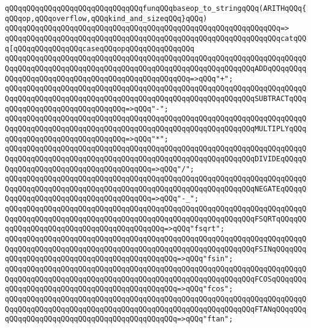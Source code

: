 \newline
\newline
\verb|qQQqqQQqqQQqqQQqqQQqqQQqqQQqqQQqfunqQQqbaseop_to_stringqQQq(ARITHqQQq{qQQqop,qQQqoverflow,qQQqkind_and_sizeqQQq}qQQq)|\newline
\verb|qQQqqQQqqQQqqQQqqQQqqQQqqQQqqQQqqQQqqQQqqQQqqQQqqQQqqQQqqQQqqQQq=>|\newline
\verb|qQQqqQQqqQQqqQQqqQQqqQQqqQQqqQQqqQQqqQQqqQQqqQQqqQQqqQQqqQQqqQQqcatqQQq[qQQqqQQqqQQqqQQqcaseqQQqopqQQqqQQqqQQqqQQq|\newline
\verb|qQQqqQQqqQQqqQQqqQQqqQQqqQQqqQQqqQQqqQQqqQQqqQQqqQQqqQQqqQQqqQQqqQQqqQQqqQQqqQQqqQQqqQQqqQQqqQQqqQQqqQQqqQQqqQQqqQQqqQQqqQQqqQQqADDqQQqqQQqqQQqqQQqqQQqqQQqqQQqqQQqqQQqqQQqqQQqqQQqqQQq=>qQQq"+";|\newline
\verb|qQQqqQQqqQQqqQQqqQQqqQQqqQQqqQQqqQQqqQQqqQQqqQQqqQQqqQQqqQQqqQQqqQQqqQQqqQQqqQQqqQQqqQQqqQQqqQQqqQQqqQQqqQQqqQQqqQQqqQQqqQQqqQQqSUBTRACTqQQqqQQqqQQqqQQqqQQqqQQqqQQqqQQq=>qQQq"-";|\newline
\verb|qQQqqQQqqQQqqQQqqQQqqQQqqQQqqQQqqQQqqQQqqQQqqQQqqQQqqQQqqQQqqQQqqQQqqQQqqQQqqQQqqQQqqQQqqQQqqQQqqQQqqQQqqQQqqQQqqQQqqQQqqQQqqQQqMULTIPLYqQQqqQQqqQQqqQQqqQQqqQQqqQQqqQQq=>qQQq"*";|\newline
\verb|qQQqqQQqqQQqqQQqqQQqqQQqqQQqqQQqqQQqqQQqqQQqqQQqqQQqqQQqqQQqqQQqqQQqqQQqqQQqqQQqqQQqqQQqqQQqqQQqqQQqqQQqqQQqqQQqqQQqqQQqqQQqqQQqDIVIDEqQQqqQQqqQQqqQQqqQQqqQQqqQQqqQQqqQQqqQQq=>qQQq"/";|\newline
\verb|qQQqqQQqqQQqqQQqqQQqqQQqqQQqqQQqqQQqqQQqqQQqqQQqqQQqqQQqqQQqqQQqqQQqqQQqqQQqqQQqqQQqqQQqqQQqqQQqqQQqqQQqqQQqqQQqqQQqqQQqqQQqqQQqNEGATEqQQqqQQqqQQqqQQqqQQqqQQqqQQqqQQqqQQqqQQq=>qQQq"-_";|\newline
\verb|qQQqqQQqqQQqqQQqqQQqqQQqqQQqqQQqqQQqqQQqqQQqqQQqqQQqqQQqqQQqqQQqqQQqqQQqqQQqqQQqqQQqqQQqqQQqqQQqqQQqqQQqqQQqqQQqqQQqqQQqqQQqqQQqFSQRTqQQqqQQqqQQqqQQqqQQqqQQqqQQqqQQqqQQqqQQqqQQq=>qQQq"fsqrt";|\newline
\verb|qQQqqQQqqQQqqQQqqQQqqQQqqQQqqQQqqQQqqQQqqQQqqQQqqQQqqQQqqQQqqQQqqQQqqQQqqQQqqQQqqQQqqQQqqQQqqQQqqQQqqQQqqQQqqQQqqQQqqQQqqQQqqQQqFSINqQQqqQQqqQQqqQQqqQQqqQQqqQQqqQQqqQQqqQQqqQQqqQQq=>qQQq"fsin";|\newline
\verb|qQQqqQQqqQQqqQQqqQQqqQQqqQQqqQQqqQQqqQQqqQQqqQQqqQQqqQQqqQQqqQQqqQQqqQQqqQQqqQQqqQQqqQQqqQQqqQQqqQQqqQQqqQQqqQQqqQQqqQQqqQQqqQQqFCOSqQQqqQQqqQQqqQQqqQQqqQQqqQQqqQQqqQQqqQQqqQQqqQQq=>qQQq"fcos";|\newline
\verb|qQQqqQQqqQQqqQQqqQQqqQQqqQQqqQQqqQQqqQQqqQQqqQQqqQQqqQQqqQQqqQQqqQQqqQQqqQQqqQQqqQQqqQQqqQQqqQQqqQQqqQQqqQQqqQQqqQQqqQQqqQQqqQQqFTANqQQqqQQqqQQqqQQqqQQqqQQqqQQqqQQqqQQqqQQqqQQqqQQq=>qQQq"ftan";|\newline
